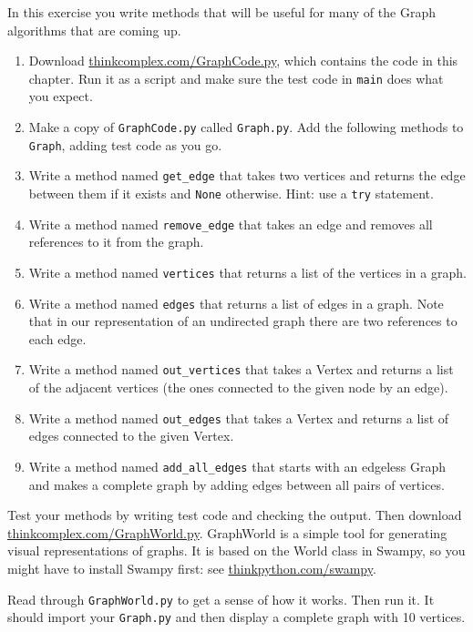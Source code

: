 \documentclass[10pt]{book}
\begin{document}
\begin{ex}

In this exercise you write methods that will be
useful for many of the Graph algorithms that are coming up.

\begin{enumerate}

\item Download \url{thinkcomplex.com/GraphCode.py}, which
  contains the code in this chapter.  Run it as a script and make sure
  the test code in {\tt main} does what you expect.

\item Make a copy of {\tt GraphCode.py} called {\tt Graph.py}.  Add
  the following methods to {\tt Graph}, adding test code as you go.

\item Write a method named \verb"get_edge" that takes two vertices and
  returns the edge between them if it exists and {\tt None} otherwise.
  Hint: use a {\tt try} statement.

\item Write a method named \verb"remove_edge" that takes an edge and
  removes all references to it from the graph.

\item Write a method named {\tt vertices} that returns a list of the
  vertices in a graph.

\item Write a method named {\tt edges} that returns a list of edges in
  a graph.  Note that in our representation of an undirected graph
  there are two references to each edge.

\item Write a method named \verb"out_vertices" that takes a Vertex and
  returns a list of the adjacent vertices (the ones connected to the
  given node by an edge).

\item Write a method named \verb"out_edges" that takes a Vertex and
  returns a list of edges connected to the given Vertex.

\item Write a method named \verb"add_all_edges" that starts with an
  edgeless Graph and makes a complete graph by adding edges between
  all pairs of vertices.

\end{enumerate}

Test your methods by writing test code and checking the output.  Then
download \url{thinkcomplex.com/GraphWorld.py}.  GraphWorld is
a simple tool for generating visual representations of graphs.  It is
based on the World class in Swampy, so you might have to install
Swampy first: see \url{thinkpython.com/swampy}.

Read through {\tt GraphWorld.py} to get a sense of how it works.  Then
run it.  It should import your {\tt Graph.py} and then display a
complete graph with 10 vertices.

\end{ex}
\end{document}
